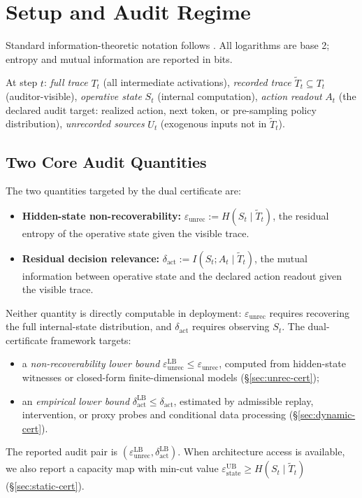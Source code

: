   \section{Setup and Audit Regime}
  \label{sec:setup}

  Standard information-theoretic notation follows \citet{cover2006elements}. All
   logarithms are base 2; entropy and mutual information are reported in bits.

  At step $t$: \emph{full trace} $T_t$ (all intermediate activations),
  \emph{recorded trace} $\tilde T_t \subseteq T_t$ (auditor-visible),
  \emph{operative state} $S_t$ (internal computation), \emph{action readout}
  $A_t$ (the declared audit target: realized action, next token, or pre-sampling
  policy distribution), \emph{unrecorded sources} $U_t$ (exogenous inputs not in
  $\tilde T_t$).

  \subsection{Two Core Audit Quantities}

  \begin{definition}
  \label{def:certs}
  The two quantities targeted by the dual certificate are:
  \begin{itemize}
    \item \textbf{Hidden-state non-recoverability:}
  $\varepsilon_\text{unrec}:=H(S_t \mid \tilde T_t)$, the residual entropy of
  the operative state given the visible trace.
    \item \textbf{Residual decision relevance:} $\delta_\text{act} := I(S_t; A_t
   \mid \tilde T_t)$, the mutual information between operative state and the
  declared action readout given the visible trace.
  \end{itemize}
  Neither quantity is directly computable in deployment:
  $\varepsilon_\text{unrec}$ requires recovering the full internal-state
  distribution, and $\delta_\text{act}$ requires observing $S_t$. The
  dual-certificate framework targets:
  \begin{itemize}
    \item a \emph{non-recoverability lower bound}
  $\varepsilon_\text{unrec}^\text{LB}\leq \varepsilon_\text{unrec}$, computed
  from hidden-state witnesses or closed-form finite-dimensional models
  (\S\ref{sec:unrec-cert});
    \item an \emph{empirical lower bound} $\delta_\text{act}^\text{LB} \leq
  \delta_\text{act}$, estimated by admissible replay, intervention, or proxy
  probes and conditional data processing
  (\S\ref{sec:dynamic-cert}).
  \end{itemize}
  The reported audit pair is $(\varepsilon_\text{unrec}^\text{LB},
  \delta_\text{act}^\text{LB})$. When architecture access is available, we also
  report a capacity map with min-cut value
  $\varepsilon_\text{state}^\text{UB}\geq H(S_t\mid\tilde T_t)$
  (\S\ref{sec:static-cert}).
  \end{definition}

